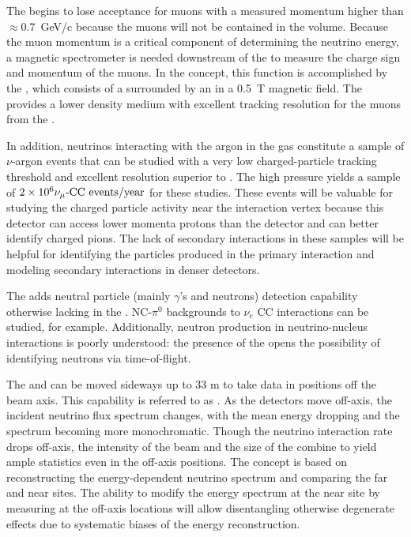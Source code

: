 The  begins to lose acceptance for muons with a measured momentum higher than 
$\approx$0.7~GeV/c because the muons will not be contained in the  volume.  Because the muon momentum is a critical component of determining the neutrino energy, a magnetic spectrometer is needed downstream of the  to measure the charge sign and momentum of the muons.  In the   concept, this function is accomplished by the , which consists of a  surrounded by an  in a \SI{0.5}{T} magnetic field. The  provides a lower density medium with excellent tracking resolution for the muons from the .  

In addition, neutrinos interacting with the argon in the gas  constitute a sample of $\nu$-argon events that can be studied with a very low charged-particle tracking threshold and excellent resolution superior to . The high pressure yields a sample of $\num{2e6}{\numu \text{-CC events/year}}$ for these studies. These events will be valuable for studying the charged particle activity near the interaction vertex because this detector can access lower momenta protons than the  detector and can better identify charged pions.  The lack of secondary interactions in these samples will be helpful for identifying the particles produced in the primary interaction and modeling secondary interactions in denser detectors.

The  adds neutral particle (mainly $\gamma$'s and 
neutrons) detection capability otherwise lacking in the .
NC-$\pi^0$ backgrounds to $\nu_e$ CC interactions can be studied, 
for example.  
Additionally, neutron production in neutrino-nucleus interactions 
is poorly understood: the presence of the  
opens the possibility of identifying neutrons via time-of-flight.

The  and  can be moved sideways up to 33 m to take data in positions off the beam axis.  This capability is referred to as . As the detectors move off-axis, the incident neutrino flux spectrum changes, with the mean energy dropping and the spectrum becoming more monochromatic.  Though the neutrino interaction rate drops off-axis, the intensity of the beam and the size of the   combine to yield ample statistics even in the off-axis positions.
The  concept is based on reconstructing the energy-dependent neutrino spectrum and
comparing the far and near sites. The ability to modify the energy spectrum at the near site by measuring at the off-axis locations will allow disentangling otherwise degenerate effects due to systematic biases of the energy reconstruction.

